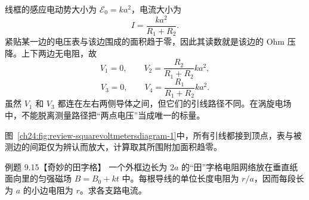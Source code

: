 \begin{xesolution}
线框的感应电动势大小为 $\mathcal E_0=ka^2$，电流大小为
\begin{equation}
  I=\frac{ka^2}{R_1+R_2}.
\end{equation}
紧贴某一边的电压表与该边围成的面积趋于零，因此其读数就是该边的 Ohm 压降。上下两边无电阻，故
\begin{equation}
  \boxed{V_1=0},
  \qquad
  \boxed{V_2=\frac{R_2}{R_1+R_2}ka^2},
\end{equation}
\begin{equation}
  \boxed{V_3=0},
  \qquad
  \boxed{V_4=\frac{R_1}{R_1+R_2}ka^2}.
\end{equation}
虽然 $V_1$ 和 $V_3$ 都连在左右两侧导体之间，但它们的引线路径不同。在涡旋电场中，不能脱离测量路径把“两点电压”当成唯一的标量。

图~\ref{ch24:fig:review-squarevoltmetersdiagram-1}中，所有引线都接到顶点，表与被测边的间距仅为辨认而放大，计算取其所围附加面积趋零。

\end{xesolution}

\begin{origexamplebox}{例题 9.15【奇妙的田字格】}
一个外框边长为 $2a$ 的“田”字格电阻网络放在垂直纸面向里的匀强磁场 $B=B_0+kt$ 中。每根导线的单位长度电阻为 $r/a$，因而每段长为 $a$ 的小边电阻为 $r$。求各支路电流。

%
\begin{center}\end{center}
\label{fig:em24-question-15}
\end{origexamplebox}

